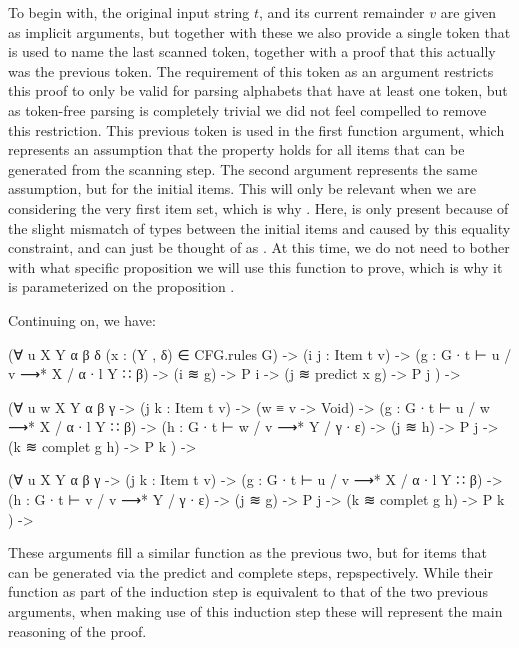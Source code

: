 		To begin with, the original input string $t$, and its current remainder
		$v$ are given as implicit arguments, but together with these we also
		provide a single token that is used to name the last scanned token,
		together with a proof that this actually was the previous token.  The
		requirement of this token as an argument restricts this proof to only
		be valid for parsing alphabets that have at least one token, but as
		token-free parsing is completely trivial we did not feel compelled to
		remove this restriction. This previous token is used in the first
		function argument, which represents an assumption that the property
		 holds for all items that can be generated from the scanning
		step. The second argument represents the same assumption, but for the
		initial items. This will only be relevant when we are considering the
		very first item set, which is why . Here,
		 is only present because of the slight mismatch of
		types between the initial items and  caused by this equality
		constraint, and can just be thought of as . At this time,
		we do not need to bother with what specific proposition we will use
		this function to prove, which is why it is parameterized on the
		proposition .

		Continuing on, we have:

		\begin{code}
			    (∀ {u X Y α β δ} (x : (Y , δ) ∈ CFG.rules G) ->
			      (i j : Item t v) ->
			      (g : G ∙ t ⊢ u / v ⟶* X / α ∙ l Y ∷ β) ->
			      (i ≋ g) -> P i ->
			      (j ≋ predict x g) -> P j
			    ) ->
			
			    (∀ {u w X Y α β γ} ->
			      (j k : Item t v) ->
			      (w ≡ v -> Void) ->
			      (g : G ∙ t ⊢ u / w ⟶* X / α ∙ l Y ∷ β) ->
			      (h : G ∙ t ⊢ w / v ⟶* Y / γ ∙ ε) ->
			      (j ≋ h) -> P j ->
			      (k ≋ complet g h) -> P k
			    ) ->
			
			    (∀ {u X Y α β γ} ->
			      (j k : Item t v) ->
			      (g : G ∙ t ⊢ u / v ⟶* X / α ∙ l Y ∷ β) ->
			      (h : G ∙ t ⊢ v / v ⟶* Y / γ ∙ ε) ->
			      (j ≋ g) -> P j ->
			      (k ≋ complet g h) -> P k
			    ) ->
		\end{code}

		These arguments fill a similar function as the previous two, but for
		items that can be generated via the predict and complete steps,
		repspectively. While their function as part of the induction step is
		equivalent to that of the two previous arguments, when making use of
		this induction step these will represent the main reasoning of the
		proof.

